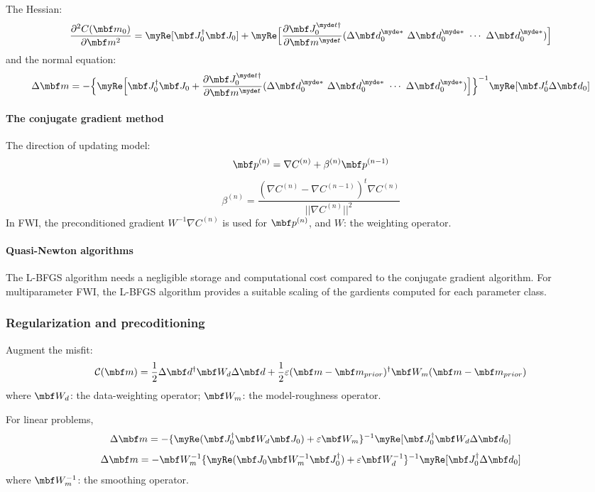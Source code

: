 The Hessian:
\[ \frac{\partial^2 C(\mbf m_0)}{\partial\mbf m^2}=\myRe[\mbf J_0^\dagger\mbf J_0]
  +\myRe\Big[\frac{\partial\mbf J_0^{\myde t\dagger}}{\partial\mbf m^{\myde t}}
  (\Delta\mbf d_0^{\myde *}~\Delta\mbf d_0^{\myde *}~\cdots~\Delta\mbf d_0^{\myde *})\Big] \]
and the normal equation:
\[ \Delta\mbf m=-\Big\{\myRe\Big[\mbf J_0^\dagger\mbf J_0
  +\frac{\partial\mbf J_0^{\myde t\dagger}}{\partial\mbf m^{\myde t}}
  (\Delta\mbf d_0^{\myde *}~\Delta\mbf d_0^{\myde *}~\cdots~\Delta\mbf d_0^{\myde *})
  \Big]\Big\}^{-1}\myRe[\mbf J_0^t\Delta\mbf d_0] \]

\paragraph{The conjugate gradient method}
The direction of updating model:
\[ \mbf p^{(n)}=\nabla C^{(n)}+\beta^{(n)}\mbf p^{(n-1)} \]
\[ \beta^{(n)}=\frac{(\nabla C^{(n)}-\nabla C^{(n-1)})^t\nabla C^{(n)}}{||\nabla C^{(n)}||^2} \]
In FWI, the preconditioned gradient
$W^{-1}\nabla C^{(n)}$ is used for $\mbf p^{(n)}$,
and $W$: the weighting operator.

\paragraph{Quasi-Newton algorithms}
The L-BFGS algorithm needs a negligible storage and computational cost
compared to the conjugate gradient algorithm.
For multiparameter FWI, the L-BFGS algorithm provides a suitable scaling of
the gardients computed for each parameter class.

\subsubsection{Regularization and precoditioning}
Augment the misfit:
\[ \mathcal{C}(\mbf m)=\frac{1}{2}\Delta\mbf d^\dagger\mbf W_d\Delta\mbf d
  +\frac{1}{2}\varepsilon(\mbf m-\mbf m_{prior})^\dagger\mbf W_m(\mbf m-\mbf m_{prior}) \]
where $\mbf W_d$: the data-weighting operator;
$\mbf W_m$: the model-roughness operator.

For linear problems,
\[ \Delta\mbf m=-\{\myRe(\mbf J_0^\dagger\mbf W_d\mbf J_0)+\varepsilon\mbf W_m\}^{-1}
  \myRe[\mbf J_0^\dagger\mbf W_d\Delta\mbf d_0] \]
\[ \Delta\mbf m=-\mbf W_m^{-1}\{\myRe(\mbf J_0\mbf W_m^{-1}\mbf J_0^\dagger)
  +\varepsilon\mbf W_d^{-1}\}^{-1}\myRe[\mbf J_0^\dagger\Delta\mbf d_0] \]
where $\mbf W_m^{-1}$: the smoothing operator.

